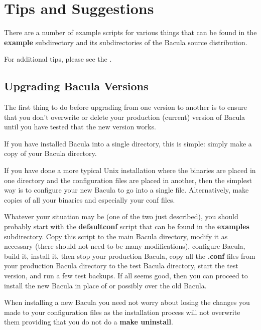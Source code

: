 
\chapter{Tips and Suggestions}
\label{TipsChapter}
\label{examples}

There are a number of example scripts for various things that can be found in
the {\bf example} subdirectory and its subdirectories of the Bacula source
distribution. 

For additional tips, please see the .

\section{Upgrading Bacula Versions}
\label{upgrading}

The first thing to do before upgrading from one version to another is to
ensure that you don't overwrite or delete your production (current) version
of Bacula until you have tested that the new version works.

If you have installed Bacula into a single directory, this is simple: simply
make a copy of your Bacula directory. 

If you have done a more typical Unix installation where the binaries are
placed in one directory and the configuration files are placed in another,
then the simplest way is to configure your new Bacula to go into a single
file. Alternatively, make copies of all your binaries and especially your 
conf files.

Whatever your situation may be (one of the two just described), you should
probably start with the {\bf defaultconf} script that can be found in the {\bf
examples} subdirectory. Copy this script to the main Bacula directory, modify
it as necessary (there should not need to be many modifications), configure
Bacula, build it, install it, then stop your production Bacula, copy all the
{\bf *.conf} files from your production Bacula directory to the test Bacula
directory, start the test version, and run a few test backups. If all seems
good, then you can proceed to install the new Bacula in place of or possibly
over the old Bacula. 

When installing a new Bacula you need not worry about losing the changes you
made to your configuration files as the installation process will not
overwrite them providing that you do not do a {\bf make uninstall}.

